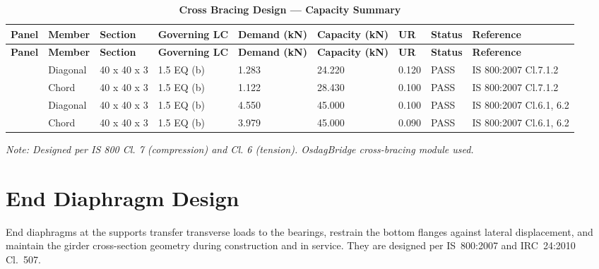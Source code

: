 \documentclass[12pt,a4paper]{report}
\numberwithin{table}{chapter}
\numberwithin{figure}{chapter}
\begin{document}
\vspace{1em}
\begin{longtable}{|C{1.3cm}|L{1.5cm}|C{1.5cm}|C{2.0cm}|C{1.6cm}|C{1.9cm}|C{1.0cm}|C{1.3cm}|C{2.0cm}|}
\caption{\textbf{Cross Bracing Design --- Capacity Summary}}
\hline
{\footnotesize\textbf{Panel}} & {\footnotesize\textbf{Member}} & {\footnotesize\textbf{Section}} & {\footnotesize\textbf{Governing LC}} & {\footnotesize\textbf{Demand (kN)}} & {\footnotesize\textbf{Capacity (kN)}} & {\footnotesize\textbf{UR}} & {\footnotesize\textbf{Status}} & {\footnotesize\textbf{Reference}} \\[6pt]
\hline
\endfirsthead

\hline
{\footnotesize\textbf{Panel}} & {\footnotesize\textbf{Member}} & {\footnotesize\textbf{Section}} & {\footnotesize\textbf{Governing LC}} & {\footnotesize\textbf{Demand (kN)}} & {\footnotesize\textbf{Capacity (kN)}} & {\footnotesize\textbf{UR}} & {\footnotesize\textbf{Status}} & {\footnotesize\textbf{Reference}} \\[6pt]
\hline
\endhead
{} & Diagonal & 40 x 40 x 3 & 1.5 EQ (b) & 1.283 & 24.220 & 0.120 & PASS & IS 800:2007 Cl.7.1.2 \\[6pt]
 & Chord & 40 x 40 x 3 & 1.5 EQ (b) & 1.122 & 28.430 & 0.100 & PASS & IS 800:2007 Cl.7.1.2 \\[6pt]
\hline
{} & Diagonal & 40 x 40 x 3 & 1.5 EQ (b) & 4.550 & 45.000 & 0.100 & PASS & IS 800:2007 Cl.6.1, 6.2 \\[6pt]
 & Chord & 40 x 40 x 3 & 1.5 EQ (b) & 3.979 & 45.000 & 0.090 & PASS & IS 800:2007 Cl.6.1, 6.2 \\[6pt]
\hline
\end{longtable}
\noindent\textit{Note: Designed per IS 800 Cl. 7 (compression) and Cl. 6 (tension). OsdagBridge cross-bracing module used.}

\section{End Diaphragm Design}
\label{sec:end-diaphragm}

End diaphragms at the supports transfer transverse loads to the bearings, restrain the bottom flanges against lateral displacement, and maintain the girder cross-section geometry during construction and in service. They are designed per IS~800:2007 and IRC~24:2010 Cl.~507.
\end{document}
